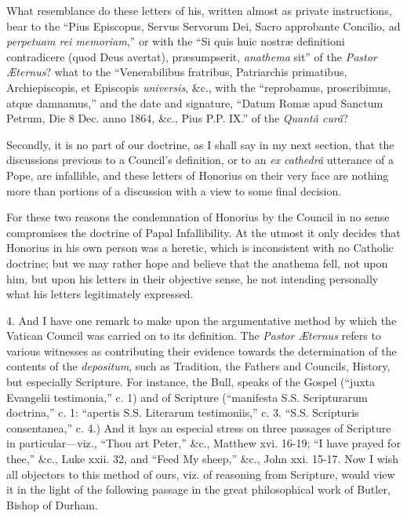 What resemblance do these letters of his, written almost as private
instructions, bear to the ``Pius Episcopus, Servus Servorum Dei,
Sacro approbante Concilio, ad \emph{perpetuam rei memoriam},'' or
with the ``Si quis huic nostræ definitioni contradicere (quod Deus
avertat), præsumpserit, \emph{anathema} sit'' of the \emph{Pastor
Æternus}? what to the ``Venerabilibus fratribus, Patriarchis
primatibus, Archiepiscopis, et Episcopis \emph{universis}, \&c., with
the ``reprobamus, proscribimus, atque damnamus,'' and the date
and signature, ``Datum Romæ apud Sanctum Petrum, Die 8 Dec. anno
1864, \&c., Pius P.P. IX.'' of the \emph{Quantâ curâ}?

Secondly, it is no part of our doctrine, as I shall say in my next
section, that the discussions previous to a Council's definition, or to
an \emph{ex cathedrâ} utterance of a Pope, are infallible, and these
letters of Honorius on their very face are nothing more than portions of
a discussion with a view to some final decision.

For these two reasons the condemnation of Honorius by the Council in
no sense compromises the doctrine of Papal Infallibility. At the utmost
it only decides that Honorius in his own person was a heretic, which is
inconsistent with no Catholic doctrine; but we may rather hope and
believe that the anathema fell, not upon him, but upon his letters in
their objective sense, he not intending personally what his letters
legitimately expressed.

4. And I have one remark to make upon the argumentative method by
which the Vatican Council was carried on to its definition. The \emph{Pastor
Æternus} refers to various witnesses as contributing their evidence
towards the determination of the contents of the \emph{depositum}, such
as Tradition, the Fathers and Councils, History, but especially
Scripture. For instance, the Bull, speaks of the Gospel (``juxta
Evangelii testimonia,'' c. 1) and of Scripture (``manifesta S.S.
Scripturarum doctrina,'' c. 1: ``apertis S.S. Literarum
testimoniis,'' c. 3. ``S.S. Scripturis consentanea,'' c. 4.)
And it lays an especial stress on three passages of Scripture in
particular—viz., ``Thou art Peter,'' \&c., Matthew xvi.
16-19; ``I have prayed for thee,'' \&c., Luke xxii. 32, and
``Feed My sheep,'' \&c., John xxi. 15-17. Now I wish all
objectors to this method of ours, viz. of reasoning from Scripture,
would view it in the light of the following passage in the great
philosophical work of Butler, Bishop of Durham.

